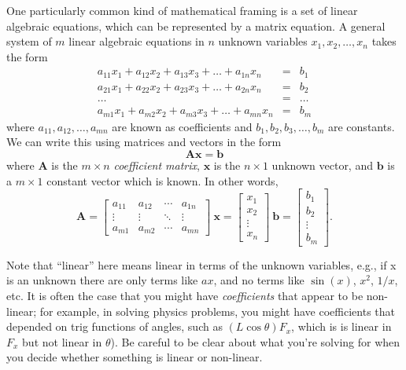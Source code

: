 One particularly common kind of mathematical framing is a set of linear algebraic equations, which can be represented by a matrix equation.  A general system of $m$ linear algebraic equations in $n$ unknown variables $x_1, x_2, \ldots, x_n$ takes the form
\begin{eqnarray*}
a_{11}x_1 + a_{12}x_2 + a_{13}x_3 + \ldots + a_{1n}x_n &=& b_1 \\
a_{21}x_1 + a_{22}x_2 + a_{23}x_3 + \ldots + a_{2n}x_n &=& b_2 \\
\ldots &=& \ldots \\
a_{m1}x_1 + a_{m2}x_2 + a_{m3}x_3 + \ldots + a_{mn}x_n &=& b_m
\end{eqnarray*}
where $a_{11}, a_{12}, \ldots, a_{mn}$ are known as coefficients and $b_1, b_2, b_3, \ldots, b_m$ are constants. We can write this using matrices and vectors in the form
\[ \mathbf{A} \mathbf{x} = \mathbf{b} \]
where $\mathbf{A}$ is the $m \times n$ \textit{ coefficient matrix}, $\mathbf{x}$ is the $n \times 1$ unknown vector, and $\mathbf{b}$ is a $m \times 1$ constant vector which is known. In other words,
$$\mathbf{A} = \begin{bmatrix} a_{11} & a_{12} & \cdots & a_{1n} \\ \vdots & \vdots & \ddots & \vdots \\
a_{m1} & a_{m2} & \cdots & a_{mn} \end{bmatrix} \ \mathbf{x} = \begin{bmatrix} x_1 \\ x_2 \\ \vdots \\ x_n\end{bmatrix} \ \mathbf{b} = \begin{bmatrix} b_1 \\ b_2 \\ \vdots \\ b_m \end{bmatrix}.$$

Note that ``linear'' here means linear in terms of the unknown variables, e.g., if x is an unknown there are only terms like $ax$, and no terms like $\sin(x)$, $x^2$, $1/x$, etc.  It is often the case that you might have \textit{ coefficients} that appear to be non-linear; for example, in solving physics problems, you might have coefficients that depended on trig functions of angles, such as $(L \cos \theta) F_x$, which is is linear in $F_x$ but not linear in $\theta$).  Be careful to be clear about what you're solving for when you decide whether something is linear or non-linear.

